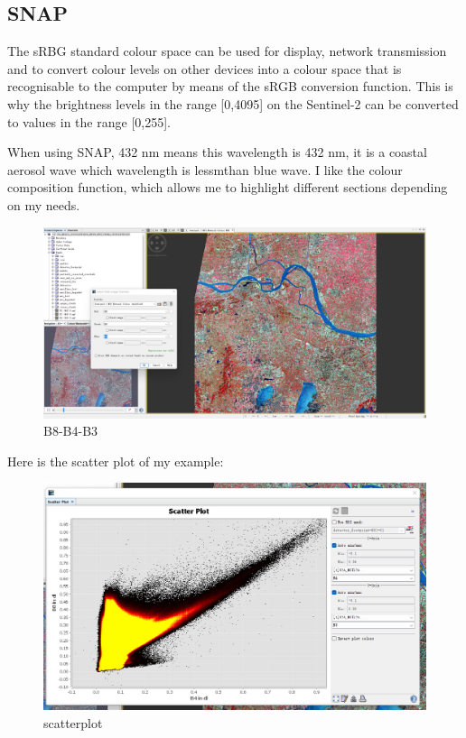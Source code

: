 \documentclass[
  letterpaper,
  DIV=11,
  numbers=noendperiod]{scrreprt}
\begin{document}
\hypertarget{snap}{%
\subsection{SNAP}\label{snap}}

The sRBG standard colour space can be used for display, network
transmission and to convert colour levels on other devices into a colour
space that is recognisable to the computer by means of the sRGB
conversion function. This is why the brightness levels in the range
{[}0,4095{]} on the Sentinel-2 can be converted to values in the range
{[}0,255{]}.

When using SNAP, 432 nm means this wavelength is 432 nm, it is a coastal
aerosol wave which wavelength is lessmthan blue wave. I like the colour
composition function, which allows me to highlight different sections
depending on my needs.

\begin{figure}

{\centering \includegraphics[width=6.25in,height=\textheight]{./image/B8-B4-B3.png}

}

\caption{B8-B4-B3}

\end{figure}

Here is the scatter plot of my example:

\begin{figure}

{\centering \includegraphics[width=6.25in,height=\textheight]{./image/scatterplot.png}

}

\caption{scatterplot}

\end{figure}
\end{document}
